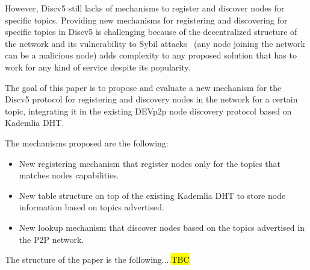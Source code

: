 However,   Discv5 still lacks of mechanisms to register and discover nodes for specific topics.
Providing new mechanisms for registering and discovering for specific topics in Discv5 is challenging because of the decentralized structure of the network and its vulnerability to Sybil attacks~\cite{} (any node joining the network can be a malicious node) adds complexity to any proposed solution that has to work for any kind of service despite its popularity.




The goal of this paper is to propose and evaluate a new mechanism for the Discv5 protocol for registering and discovery nodes in the network for a certain topic,  integrating it in the existing DEVp2p node discovery protocol based on Kademlia DHT.  

The mechanisms proposed are the following:

\begin{itemize}
 \item New registering mechanism that register nodes only for the topics that matches nodes capabilities.
 \item New table structure on top of the existing Kademlia DHT to store node information based on topics advertised.
 \item New lookup mechanism that discover nodes based on the topics advertised in the P2P network.
\end{itemize}
    
The structure of the paper is the following....\hl{TBC}
